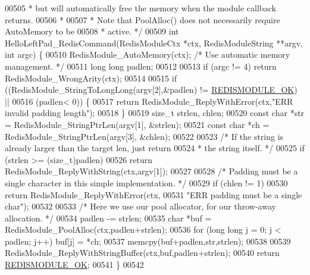 \begin{DoxyCode}
00505 \textcolor{comment}{ * but will automatically free the memory when the module callback returns.}
00506 \textcolor{comment}{ *}
00507 \textcolor{comment}{ * Note that PoolAlloc() does not necessarily require AutoMemory to be}
00508 \textcolor{comment}{ * active. */}
00509 \textcolor{keywordtype}{int} HelloLeftPad\_RedisCommand(RedisModuleCtx *ctx, RedisModuleString **argv, \textcolor{keywordtype}{int} argc) \{
00510     RedisModule\_AutoMemory(ctx); \textcolor{comment}{/* Use automatic memory management. */}
00511     \textcolor{keywordtype}{long} \textcolor{keywordtype}{long} padlen;
00512 
00513     \textcolor{keywordflow}{if} (argc != 4) \textcolor{keywordflow}{return} RedisModule\_WrongArity(ctx);
00514 
00515     \textcolor{keywordflow}{if} ((RedisModule\_StringToLongLong(argv[2],&padlen) != \hyperlink{redismodule_8h_a1bc5bfd69abcd378ff52c640adc5418d}{REDISMODULE\_OK}) ||
00516         (padlen< 0)) \{
00517         \textcolor{keywordflow}{return} RedisModule\_ReplyWithError(ctx,\textcolor{stringliteral}{"ERR invalid padding length"});
00518     \}
00519     size\_t strlen, chlen;
00520     \textcolor{keyword}{const} \textcolor{keywordtype}{char} *str = RedisModule\_StringPtrLen(argv[1], &strlen);
00521     \textcolor{keyword}{const} \textcolor{keywordtype}{char} *ch = RedisModule\_StringPtrLen(argv[3], &chlen);
00522 
00523     \textcolor{comment}{/* If the string is already larger than the target len, just return}
00524 \textcolor{comment}{     * the string itself. */}
00525     \textcolor{keywordflow}{if} (strlen >= (size\_t)padlen)
00526         \textcolor{keywordflow}{return} RedisModule\_ReplyWithString(ctx,argv[1]);
00527 
00528     \textcolor{comment}{/* Padding must be a single character in this simple implementation. */}
00529     \textcolor{keywordflow}{if} (chlen != 1)
00530         \textcolor{keywordflow}{return} RedisModule\_ReplyWithError(ctx,
00531             \textcolor{stringliteral}{"ERR padding must be a single char"});
00532 
00533     \textcolor{comment}{/* Here we use our pool allocator, for our throw-away allocation. */}
00534     padlen -= strlen;
00535     \textcolor{keywordtype}{char} *buf = RedisModule\_PoolAlloc(ctx,padlen+strlen);
00536     \textcolor{keywordflow}{for} (\textcolor{keywordtype}{long} \textcolor{keywordtype}{long} j = 0; j < padlen; j++) buf[j] = *ch;
00537     memcpy(buf+padlen,str,strlen);
00538 
00539     RedisModule\_ReplyWithStringBuffer(ctx,buf,padlen+strlen);
00540     \textcolor{keywordflow}{return} \hyperlink{redismodule_8h_a1bc5bfd69abcd378ff52c640adc5418d}{REDISMODULE\_OK};
00541 \}
00542 

\end{DoxyCode}
